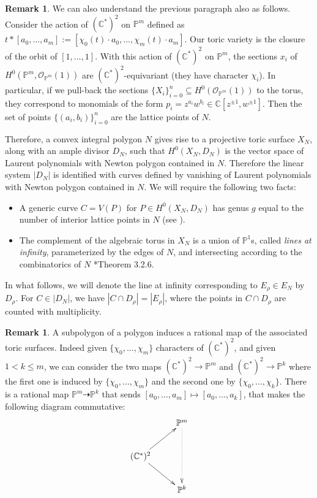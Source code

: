 \documentclass[11pt]{article} %
\theoremstyle{definition}
\newtheorem{remark}[theorem]{Remark}
\newcommand{\marg}[1]{\normalsize{{\color{red}\footnote{{\color{blue}#1}}}{\marginpar[{\color{red}\hfill\tiny\thefootnote$\rightarrow$}]{{\color{red}$\leftarrow$\tiny\thefootnote}}}}}
\newcommand{\Gio}[1]{\marg{(Giovanni) #1}}
\newcommand{\green}[1]{{\color{calpolypomonagreen} #1}}
\begin{document}
\begin{remark}\label{remark_sections_are_lattice_pts}
We can also understand the previous paragraph also as follows. Consider the action of $(\mathbb{C}^{*})^{ 2}$ on $\mathbb{P}^m$ defined as $t*[a_0,\dots,a_m]:=[\chi_0(t)\cdot a_0,\dots,\chi_m(t)\cdot a_m]$. Our toric variety is the closure of the orbit of $[1,\dots,1]$. With this action of
$(\mathbb{C}^{*})^{ 2}$ on $\mathbb{P}^m$, the sections $x_i$ of $H^0(\mathbb{P}^m, \mathcal{O}_{\mathbb{P}^m}(1))$ are $(\mathbb{C}^{*})^{ 2}$-equivariant (they have character
$\chi_i$). In particular, if we pull-back the sections $\{X_i\}_{i=0}^n\subseteq H^0(\mathcal{O}_{\mathbb{P}^m}(1))$ to the torus, they correspond to monomials of the form $p_i = z^{a_i}w^{b_i} \in \mathbb{C}[z^{\pm 1},w^{\pm 1}]$. Then the set of points $\{(a_i,b_i)\}_{i=0}^n$ are the lattice points of $N$. %
\end{remark} 

Therefore, a convex integral polygon $N$ gives rise to a projective toric surface $X_N$, along with an ample divisor $D_N$, such that $H^0(X_N,D_N)$ is the vector space of Laurent polynomials with Newton polygon {contained in} $N$. Therefore the linear system $|D_N|$ is identified with curves defined by vanishing of Laurent polynomials with Newton polygon {contained in} $N$. We will require the following two facts:
\begin{itemize}
    \item A generic curve $C = V(P)$ for $P\in H^0(X_N,D_N)$ has genus $g$ equal to the number of interior lattice points in $N$ (see \cite[Proposition 10.5.8]{CLS11}). 
    \item The complement of the algebraic torus in $X_N$ is a union of $\mathbb P^1$s, called \textit{lines at infinity}, parameterized by the edges of $N$, and intersecting according to the combinatorics of $N$ \cite{CLS11}*{Theorem 3.2.6}.
\end{itemize}

  In what follows, we will denote the line at infinity corresponding to $E_\rho \in E_N$ by $D_\rho$. For $C \in |D_N|$, we have $|C \cap D_\rho|=|E_\rho|$, where the points in $C \cap D_\rho$ are counted with multiplicity.

\begin{remark}
A subpolygon of a polygon induces a rational map of the associated toric surfaces. Indeed given $\{\chi_0,\dots,\chi_m\}$ characters of $(\mathbb{C}^{*})^{ 2} $, and given $1<k\le m$, we can consider the two maps $(\mathbb{C}^{*})^{ 2} \to \mathbb{P}^m$ and $(\mathbb{C}^{*})^{ 2} \to \mathbb{P}^k$ where the first one is induced by $\{\chi_0,\dots,\chi_m\}$ and the second one by $\{\chi_0,\dots,\chi_k\}$. There is a rational map $\mathbb{P}^m\dashrightarrow \mathbb{P}^k$ that sends $[a_0,\dots,a_m]\mapsto [a_0,\dots,a_k]$, that makes the following diagram commutative:
$$\xymatrix{ & \mathbb{P}^m\ar@{..>}[dd]\\(\mathbb{C}^{*})^{ 2} \ar[ru]\ar[rd] & \\ & \mathbb{P}^k }$$
\end{remark}
\end{document}
